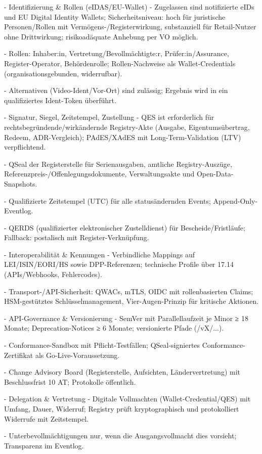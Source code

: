 \documentclass[12pt,a4paper]{scrartcl}
\begin{document}
- Identifizierung \& Rollen (eIDAS/EU-Wallet)
- Zugelassen sind notifizierte eIDs und EU Digital Identity Wallets; Sicherheitsniveau: hoch für juristische Personen/Rollen mit Vermögens-/Registerwirkung, substanziell für Retail-Nutzer ohne Drittwirkung; risikoadäquate Anhebung per VO möglich.

- Rollen: Inhaber:in, Vertretung/Bevollmächtigte:r, Prüfer:in/Assurance, Register-Operator, Behördenrolle; Rollen-Nachweise als Wallet-Credentials (organisationsgebunden, widerrufbar).

- Alternativen (Video-Ident/Vor-Ort) sind zulässig; Ergebnis wird in ein qualifiziertes Ident-Token überführt.

- Signatur, Siegel, Zeitstempel, Zustellung
- QES ist erforderlich für rechtsbegründende/wirkändernde Registry-Akte (Ausgabe, Eigentumsübertrag, Redeem, ADR-Vergleich); PAdES/XAdES mit Long-Term-Validation (LTV) verpflichtend.

- QSeal der Registerstelle für Serienausgaben, amtliche Registry-Auszüge, Referenzpreis-/Offenlegungsdokumente, Verwaltungsakte und Open-Data-Snapshots.

- Qualifizierte Zeitstempel (UTC) für alle statusändernden Events; Append-Only-Eventlog.

- QERDS (qualifizierter elektronischer Zustelldienst) für Bescheide/Fristläufe; Fallback: postalisch mit Register-Verknüpfung.

- Interoperabilität \& Kennungen
- Verbindliche Mappings auf LEI/ISIN/EORI/HS sowie DPP-Referenzen; technische Profile über 17.14 (APIs/Webhooks, Fehlercodes).

- Transport-/API-Sicherheit: QWACs, mTLS, OIDC mit rollenbasierten Claims; HSM-gestütztes Schlüsselmanagement, Vier-Augen-Prinzip für kritische Aktionen.

- API-Governance \& Versionierung
- SemVer mit Parallellaufzeit je Minor ≥ 18 Monate; Deprecation-Notices ≥ 6 Monate; versionierte Pfade (/vX/...).

- Conformance-Sandbox mit Pflicht-Testfällen; QSeal-signiertes Conformance-Zertifikat als Go-Live-Voraussetzung.

- Change Advisory Board (Registerstelle, Aufsichten, Ländervertretung) mit Beschlussfrist 10 AT; Protokolle öffentlich.

- Delegation \& Vertretung
- Digitale Vollmachten (Wallet-Credential/QES) mit Umfang, Dauer, Widerruf; Registry prüft kryptographisch und protokolliert Widerrufe mit Zeitstempel.

- Unterbevollmächtigungen nur, wenn die Ausgangsvollmacht dies vorsieht; Transparenz im Eventlog.
\end{document}
